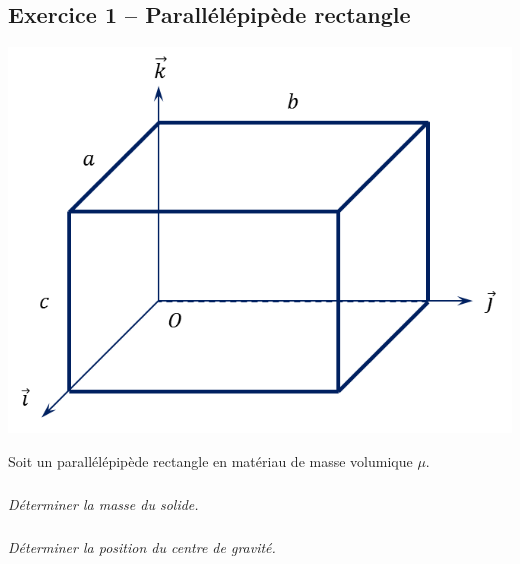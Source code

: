 \documentclass[10pt]{article}
\begin{document}
\subsection*{Exercice 1 -- Parallélépipède rectangle}
\begin{minipage}[c]{.3\linewidth}
\begin{center}
\includegraphics[width=.95\textwidth]{images/parallelepipede}
\end{center}
\end{minipage} \hfill
\begin{minipage}[c]{.65\linewidth}
Soit un parallélépipède rectangle en matériau de masse volumique $\mu$.
\subparagraph{}
\textit{Déterminer la masse du solide.}
\subparagraph{}
\textit{Déterminer la position du centre de gravité.}
\end{minipage}
\end{document}

